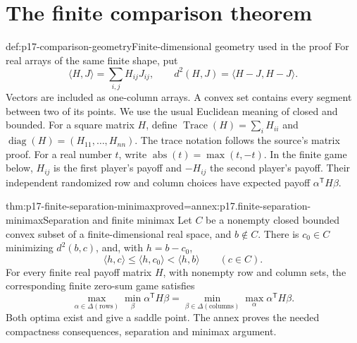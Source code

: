 \section{The finite comparison theorem}
\label{sec:p17-finite-blackwell}

\begin{hbdefinition}{def:p17-comparison-geometry}{Finite-dimensional geometry used in the proof}
For real arrays of the same finite shape, put
\[
 \langle H,J\rangle=\sum_{i,j}H_{ij}J_{ij},\qquad
 d^2(H,J)=\langle H-J,H-J\rangle.
\]
Vectors are included as one-column arrays. A convex set contains every
segment between two of its points. We use the usual Euclidean meaning of
closed and bounded.
For a square matrix \(H\), define
\(\operatorname{Trace}(H)=\sum_i H_{ii}\) and
\(\operatorname{diag}(H)=(H_{11},\ldots,H_{nn})\).
The trace notation follows the source's matrix proof.
For a real number \(t\), write \(\operatorname{abs}(t)=\max(t,-t)\).
In the finite game below, \(H_{ij}\) is the first player's payoff and
\(-H_{ij}\) the second player's payoff. Their independent randomized
row and column choices have expected payoff \(\alpha^{\mathsf T}H\beta\).
\end{hbdefinition}

\begin{hblemma}{thm:p17-finite-separation-minimax}{proved=annex:p17.finite-separation-minimax}{Separation and finite minimax}
Let \(C\) be a nonempty closed bounded convex subset of a finite-dimensional
real space, and \(b\notin C\). There is \(c_0\in C\) minimizing
\(d^2(b,c)\), and, with \(h=b-c_0\),
\[
 \langle h,c\rangle\leq\langle h,c_0\rangle
                      <\langle h,b\rangle\qquad(c\in C).
\]
For every finite real payoff matrix \(H\), with nonempty row and column
sets, the corresponding finite zero-sum game satisfies
\[
 \max_{\alpha\in\Delta(\text{rows})}\min_\beta \alpha^{\mathsf T}H\beta
 =
 \min_{\beta\in\Delta(\text{columns})}\max_\alpha
                  \alpha^{\mathsf T}H\beta.
\]
Both optima exist and give a saddle point. The annex proves the needed
compactness consequences, separation and minimax argument.
\end{hblemma}

